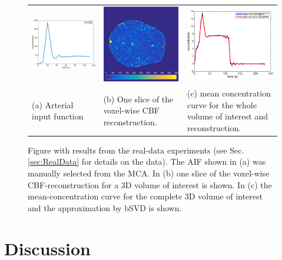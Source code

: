 \documentclass[journal,twocolumn]{IEEEtran}
\begin{document}
	\begin{figure}[h!tb]\label{fig:RealData}
		\begin{tabular}{p{} p{} p{} }
		 \includegraphics[width = .3\textwidth]{./figs/real_AIF.pdf} & \includegraphics[width = .3\textwidth]{./figs/real_axial160.pdf} & \includegraphics[width = .3\textwidth]{./figs/real_meanC.pdf} \\
		 (a) Arterial input function & (b) One slice of the voxel-wise CBF reconstruction.  & (c) mean concentration curve for the whole volume of interest and reconstruction.
		\end{tabular}
		\caption{Figure with results from the real-data experiments (see Sec. \ref{sec:RealData} for details on the data). The AIF shown in (a) was manually selected from the MCA. In (b) one slice of the voxel-wise CBF-reconstruction for a 3D volume of interest is shown. In (c) the mean-concentration curve for the complete 3D volume of interest and the approximation by bSVD is shown.}
	\end{figure}
	

	
	
	\section{Discussion}\label{sec:conclusion}
	
\end{document}
